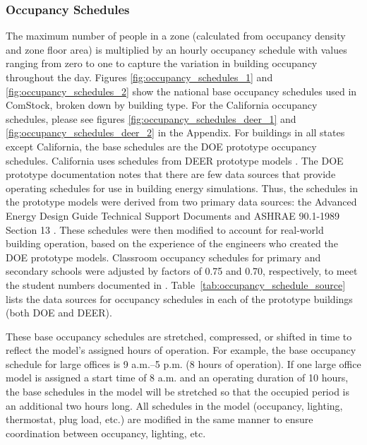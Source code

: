 \subsubsection{Occupancy Schedules}
The maximum number of people in a zone (calculated from occupancy density and zone floor area) is multiplied by an hourly occupancy schedule with values ranging from zero to one to capture the variation in building occupancy throughout the day. Figures \ref{fig:occupancy_schedules_1} and \ref{fig:occupancy_schedules_2} show the national base occupancy schedules used in ComStock, broken down by building type. For the California occupancy schedules, please see figures \ref{fig:occupancy_schedules_deer_1} and \ref{fig:occupancy_schedules_deer_2} in the Appendix. For buildings in all states except California, the base schedules are the DOE prototype occupancy schedules. California uses schedules from DEER prototype models \citep{cpuc_deer}. The DOE prototype documentation \citep{deru_2011} notes that there are few data sources that provide operating schedules for use in building energy simulations. Thus, the schedules in the prototype models were derived from two primary data sources: the Advanced Energy Design Guide Technical Support Documents \citep{jiang_2008,doebber_2009,liu_2007,pless_2007} and ASHRAE 90.1-1989 Section 13 \citep{ashrae_1989}. These schedules were then modified to account for real-world building operation, based on the experience of the engineers who created the DOE prototype models. Classroom occupancy schedules for primary and secondary schools were adjusted by factors of 0.75 and 0.70, respectively, to meet the student numbers documented in \cite{pless_2007}. Table~\ref{tab:occupancy_schedule_source} lists the data sources for occupancy schedules in each of the prototype buildings (both DOE and DEER).

These base occupancy schedules are stretched, compressed, or shifted in time to reflect the model’s assigned hours of operation. For example, the base occupancy schedule for large offices is 9 a.m.--5 p.m. (8 hours of operation). If one large office model is assigned a start time of 8 a.m. and an operating duration of 10 hours, the base schedules in the model will be stretched so that the occupied period is an additional two hours long. All schedules in the model (occupancy, lighting, thermostat, plug load, etc.) are modified in the same manner to ensure coordination between occupancy, lighting, etc.  


